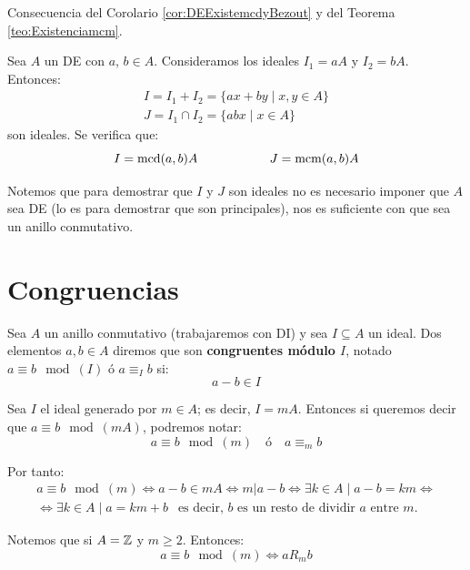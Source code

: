 \begin{coro}
    Consecuencia del Corolario \ref{cor:DEExistemcdyBezout} y del Teorema \ref{teo:Existenciamcm}.
    
    Sea $A$ un DE con $a$, $b \in A$. Consideramos los ideales $I_1 = aA$ y $I_2 = bA$. Entonces:
    \begin{gather*}
        I=I_1 + I_2 = \{ax+by \mid x,y \in A\} \\
        J=I_1 \cap I_2 = \{abx \mid x \in A\}
    \end{gather*}
    son ideales. Se verifica que:
    \begin{equation*}
        I=\operatorname{mcd}(a,b)A \hspace{2cm} J=\operatorname{mcm}(a,b)A
    \end{equation*}
    
    Notemos que para demostrar que $I$ y $J$ son ideales no es necesario imponer que $A$ sea DE (lo es para demostrar que son
    principales), nos es suficiente con que sea un anillo conmutativo.
\end{coro}

\section{Congruencias}
\begin{definicion}
    Sea $A$ un anillo conmutativo (trabajaremos con DI) y sea $I \subseteq A$ un ideal. Dos elementos $a,b \in A$ diremos que son \textbf{congruentes módulo $I$}, notado $a\equiv b\mod(I)$ ó $a\equiv_I b$ si:
    $$a-b \in I$$
\end{definicion}

\begin{notacion}
    Sea $I$ el ideal generado por $m \in A$; es decir, $I=mA$. Entonces si queremos decir que $a\equiv b\mod(mA)$, podremos notar:
    $$a\equiv b\mod(m)~~~\text{ ó }~~~a\equiv_m b$$
\end{notacion}


Por tanto:
\begin{multline*}
    a\equiv b\mod(m) \Longleftrightarrow a-b \in mA \Longleftrightarrow m|a-b \Longleftrightarrow \exists k \in A \mid a-b=km \Longleftrightarrow \\
    \Longleftrightarrow \exists k \in A \mid a = km + b ~~\text{ es decir, $b$ es un resto de dividir $a$ entre $m$.}
\end{multline*}

Notemos que si $A=\mathbb Z$ y $m\geq 2$. Entonces:
$$a\equiv b\mod(m) \Longleftrightarrow aR_mb $$


